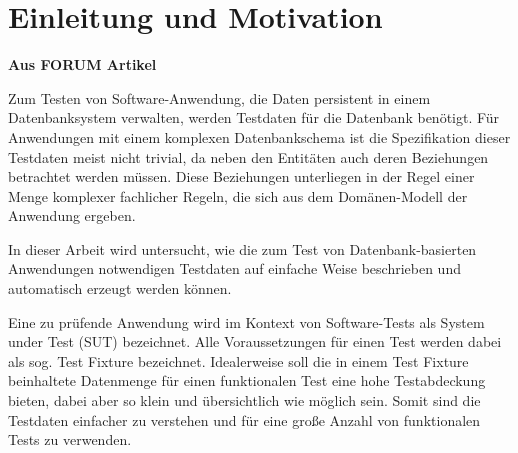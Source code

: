 \section{Einleitung und Motivation}

%
%
%
%




\textbf{Aus FORUM Artikel}

Zum Testen von Software-Anwendung, die Daten persistent in einem Datenbanksystem verwalten, werden Testdaten für die Datenbank benötigt. Für Anwendungen mit einem komplexen Datenbankschema ist die Spezifikation dieser Testdaten meist nicht trivial, da neben den Entitäten auch deren Beziehungen betrachtet werden müssen. Diese Beziehungen unterliegen in der Regel einer Menge komplexer fachlicher Regeln, die sich aus dem Domänen-Modell der Anwendung ergeben. 

In dieser Arbeit wird untersucht, wie die zum Test von Datenbank-basierten Anwendungen notwendigen Testdaten auf einfache Weise beschrieben und automatisch erzeugt werden können.


Eine zu prüfende Anwendung wird im Kontext von Software-Tests als System under Test (SUT) bezeichnet. Alle Voraussetzungen für einen Test werden dabei als sog. Test Fixture bezeichnet. Idealerweise soll die in einem Test Fixture beinhaltete Datenmenge für einen funktionalen Test eine hohe Testabdeckung bieten, dabei aber so klein und übersichtlich wie möglich sein. Somit sind die Testdaten einfacher zu verstehen und für eine große Anzahl von funktionalen Tests zu verwenden.


